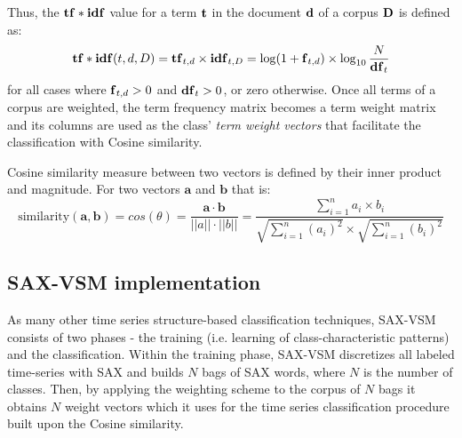 Thus, the $\text{\textbf{tf}} \ast \text{\textbf{idf}}$ value for a term $\text{\textbf{t}}$ in the document 
$\text{\textbf{d}}$ of a corpus $\text{\textbf{D}}$ is defined as:
\begin{equation}
 \text{\textbf{tf}} \ast \text{\textbf{idf}}(t, d, D) =  \text{\textbf{tf}}_{t, d} \times \text{\textbf{idf}}_{t, D} = \log(1 + \text{\textbf{f}}_{t,d})
\times \log_{10}\frac{N}{\mbox{\textbf{df}}_{t}}
 \label{formula:tfidf}
\end{equation} 
for all cases where $\mbox{\textbf{f}}_{t,d}>0$ and $\mbox{\textbf{df}}_{t}>0$, or zero otherwise.
Once all terms of a corpus are weighted, the term frequency matrix becomes a term weight matrix and its columns 
are used as the class' \textit{term weight vectors} that facilitate the classification with Cosine similarity. 

Cosine similarity measure between two vectors is defined by their inner product and magnitude. 
For two vectors $\mathbf{a}$ and $\mathbf{b}$ that is:
\begin{equation}
\mbox{similarity}(\mathbf{a},\mathbf{b}) = cos(\theta) = 
\frac{ \mathbf{a} \cdot \mathbf{b} } {\left| \left| a \right| \right| \cdot \left| \left| b \right|\right|} =
\frac{ \sum\limits_{i=1}^{n}{a_{i} \times b_{i}} }{ \sqrt{\sum\limits_{i=1}^{n}{(a_{i})^2}} \times \sqrt{\sum\limits_{i=1}^{n}{(b_{i})^2}}}
\label{eq:cosine_similarity}
\end{equation} 

\subsection{SAX-VSM implementation} \label{sax-vsm}
As many other time series structure-based classification techniques, SAX-VSM consists of two 
phases - the training (i.e. learning of class-characteristic patterns) and the classification. 
Within the training phase, SAX-VSM discretizes all labeled time-series with SAX and builds $N$ bags 
of SAX words, where $N$ is the number of classes. 
Then, by applying the \tfidf weighting scheme to the corpus of $N$ bags it obtains $N$ weight vectors 
which it uses for the time series classification procedure built upon the Cosine similarity.


